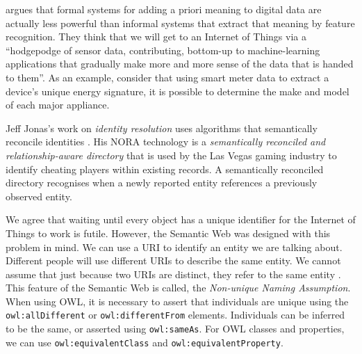 


\cite{OReilly2009} argues that formal systems for adding a priori meaning to digital data are actually less powerful than informal systems that extract that meaning by feature recognition. They think that we will get to an Internet of Things via a ``hodgepodge of sensor data, contributing, bottom-up to machine-learning applications that gradually make more and more sense of the data that is handed to them''. As an example, consider that using smart meter data to extract a device's unique energy signature, it is possible to determine the make and model of each major appliance.

Jeff Jonas's work on \emph{identity resolution} uses algorithms that semantically reconcile identities \cite{Segaran2009}. His \ac{NORA} technology is a \emph{semantically reconciled and relationship-aware directory} that is used by the Las Vegas gaming industry to identify cheating players within existing records. A semantically reconciled directory recognises when a newly reported entity references a previously observed entity.


We agree that waiting until every object has a unique identifier for the Internet of Things to work is futile. However, the Semantic Web was designed with this problem in mind. We can use a \ac{URI} to identify an entity we are talking about. Different people will use different \ac{URI}s to describe the same entity. We cannot assume that just because two \ac{URI}s are distinct, they refer to the same entity \cite{Allemang2011}. This feature of the Semantic Web is called, the \emph{Non-unique Naming Assumption}. When using \ac{OWL}, it is necessary to assert that individuals are unique using the \texttt{owl:allDifferent} or \texttt{owl:differentFrom} elements. Individuals can be inferred to be the same, or asserted using \texttt{owl:sameAs}. For \ac{OWL} classes and properties, we can use \texttt{owl:equivalentClass} and \texttt{owl:equivalentProperty}.

